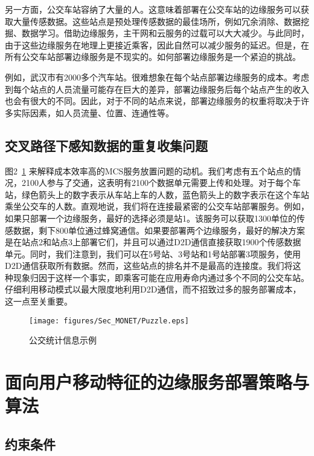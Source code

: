 另一方面，公交车站容纳了大量的人。这意味着部署在公交车站的边缘服务可以获取大量传感数据。这些站点是预处理传感数据的最佳场所，例如冗余消除、数据挖掘、数据学习。借助边缘服务，主干网和云服务的过载可以大大减少。与此同时，由于这些边缘服务在地理上更接近乘客，因此自然可以减少服务的延迟。但是，在所有公交车站部署边缘服务是不现实的。如何部署边缘服务是一个紧迫的挑战。


例如，武汉市有2000多个汽车站。很难想象在每个站点部署边缘服务的成本。考虑到每个站点的人员流量可能存在巨大的差异，部署边缘服务后每个站点产生的收入也会有很大的不同。因此，对于不同的站点来说，部署边缘服务的权重将取决于许多实际因素，如人员流量、位置、连通性等。

\subsection{交叉路径下感知数据的重复收集问题}

图2~\ref{Figure_puzzle} 来解释成本效率高的MCS服务放置问题的动机。我们考虑有五个站点的情况，2100人参与了交通，这表明有2100个数据单元需要上传和处理。对于每个车站，绿色箭头上的数字表示从车站上车的人数，蓝色箭头上的数字表示在这个车站乘坐公交车的人数。直观地说，我们将在连接最紧密的公交车站部署服务。例如，如果只部署一个边缘服务，最好的选择必须是站1。该服务可以获取1300单位的传感数据，剩下800单位通过蜂窝通信。如果要部署两个边缘服务，最好的解决方案是在站点2和站点3上部署它们，并且可以通过D2D通信直接获取1900个传感数据单元。同时，我们注意到，我们可以在5号站、3号站和1号站部署3项服务，使用D2D通信获取所有数据。然而，这些站点的排名并不是最高的连接度。我们将这种现象归因于这样一个事实，即乘客可能在应用寿命内通过多个不同的公交车站。仔细利用移动模式以最大限度地利用D2D通信，而不招致过多的服务部署成本，这一点至关重要。

\begin{figure}[!h]
\centering
\texttt{[image: figures/Sec\_MONET/Puzzle.eps]}
\caption{公交统计信息示例}
\label{Figure_puzzle}
\end{figure}

\section{面向用户移动特征的边缘服务部署策略与算法}

\subsection{约束条件}

